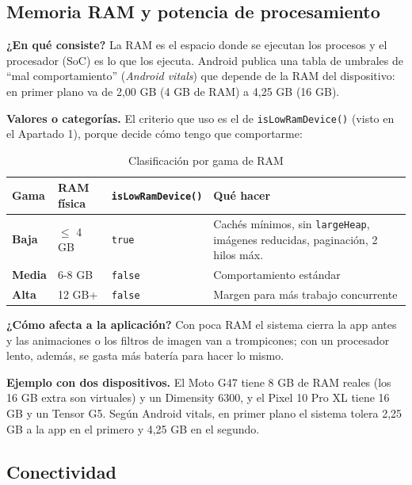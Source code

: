 \documentclass[11pt,a4paper]{article}
\newcommand{\code}[1]{\texttt{\color{navylight}#1}}
\newcommand{\campo}[1]{\textbf{\color{navy}#1}}
\begin{document}
	\subsection{Memoria RAM y potencia de procesamiento}

	\campo{¿En qué consiste?}
	La RAM es el espacio donde se ejecutan los procesos y el procesador (SoC) es lo que los ejecuta. Android publica una tabla de umbrales de \enquote{mal comportamiento} (\emph{Android vitals}) que depende de la RAM del dispositivo: en primer plano va de 2,00 GB (4 GB de RAM) a 4,25 GB (16 GB).

	\campo{Valores o categorías.} El criterio que uso es el de \code{isLowRamDevice()} (visto en el Apartado 1), porque decide cómo tengo que comportarme:

	\begin{table}[htbp]
		\centering
		\small
		\begin{tabularx}{\textwidth}{@{}l l l >{\RaggedRight\arraybackslash}X@{}}
			\toprule
			\rowcolor{primary}
			\textcolor{paper}{\sffamily\bfseries Gama} & \textcolor{paper}{\sffamily\bfseries RAM física} & \textcolor{paper}{\sffamily\bfseries \code{isLowRamDevice()}} & \textcolor{paper}{\sffamily\bfseries Qué hacer} \\
			\midrule
			\textbf{Baja} & $\leq$ 4 GB & \code{true} & Cachés mínimos, sin \code{largeHeap}, imágenes reducidas, paginación, 2 hilos máx. \\
			\rowcolor{soft}
			\textbf{Media} & 6-8 GB & \code{false} & Comportamiento estándar \\
			\textbf{Alta} & 12 GB+ & \code{false} & Margen para más trabajo concurrente \\
			\bottomrule
		\end{tabularx}
		\caption{Clasificación por gama de RAM}
	\end{table}

	\campo{¿Cómo afecta a la aplicación?}
	Con poca RAM el sistema cierra la app antes y las animaciones o los filtros de imagen van a trompicones; con un procesador lento, además, se gasta más batería para hacer lo mismo.

	\campo{Ejemplo con dos dispositivos.} El Moto G47 tiene 8 GB de RAM reales (los 16 GB extra son virtuales) y un Dimensity 6300, y el Pixel 10 Pro XL tiene 16 GB y un Tensor G5. Según Android vitals, en primer plano el sistema tolera 2,25 GB a la app en el primero y 4,25 GB en el segundo.

	\subsection{Conectividad}
\end{document}
